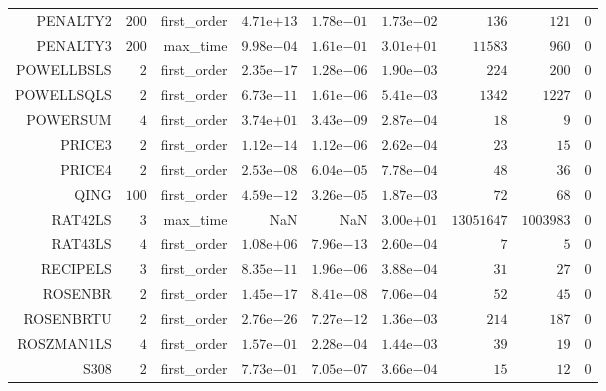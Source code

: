 \begin{longtable}{rrrrrrrrr}
PENALTY2 & \(   200\) & first\_order & \( 4.71\)e\(+13\) & \( 1.78\)e\(-01\) & \( 1.73\)e\(-02\) & \(   136\) & \(   121\) & \(     0\) \\
PENALTY3 & \(   200\) & max\_time & \( 9.98\)e\(-04\) & \( 1.61\)e\(-01\) & \( 3.01\)e\(+01\) & \( 11583\) & \(   960\) & \(     0\) \\
POWELLBSLS & \(     2\) & first\_order & \( 2.35\)e\(-17\) & \( 1.28\)e\(-06\) & \( 1.90\)e\(-03\) & \(   224\) & \(   200\) & \(     0\) \\
POWELLSQLS & \(     2\) & first\_order & \( 6.73\)e\(-11\) & \( 1.61\)e\(-06\) & \( 5.41\)e\(-03\) & \(  1342\) & \(  1227\) & \(     0\) \\
POWERSUM & \(     4\) & first\_order & \( 3.74\)e\(+01\) & \( 3.43\)e\(-09\) & \( 2.87\)e\(-04\) & \(    18\) & \(     9\) & \(     0\) \\
PRICE3 & \(     2\) & first\_order & \( 1.12\)e\(-14\) & \( 1.12\)e\(-06\) & \( 2.62\)e\(-04\) & \(    23\) & \(    15\) & \(     0\) \\
PRICE4 & \(     2\) & first\_order & \( 2.53\)e\(-08\) & \( 6.04\)e\(-05\) & \( 7.78\)e\(-04\) & \(    48\) & \(    36\) & \(     0\) \\
QING & \(   100\) & first\_order & \( 4.59\)e\(-12\) & \( 3.26\)e\(-05\) & \( 1.87\)e\(-03\) & \(    72\) & \(    68\) & \(     0\) \\
RAT42LS & \(     3\) & max\_time &       NaN &       NaN & \( 3.00\)e\(+01\) & \(13051647\) & \(1003983\) & \(     0\) \\
RAT43LS & \(     4\) & first\_order & \( 1.08\)e\(+06\) & \( 7.96\)e\(-13\) & \( 2.60\)e\(-04\) & \(     7\) & \(     5\) & \(     0\) \\
RECIPELS & \(     3\) & first\_order & \( 8.35\)e\(-11\) & \( 1.96\)e\(-06\) & \( 3.88\)e\(-04\) & \(    31\) & \(    27\) & \(     0\) \\
ROSENBR & \(     2\) & first\_order & \( 1.45\)e\(-17\) & \( 8.41\)e\(-08\) & \( 7.06\)e\(-04\) & \(    52\) & \(    45\) & \(     0\) \\
ROSENBRTU & \(     2\) & first\_order & \( 2.76\)e\(-26\) & \( 7.27\)e\(-12\) & \( 1.36\)e\(-03\) & \(   214\) & \(   187\) & \(     0\) \\
ROSZMAN1LS & \(     4\) & first\_order & \( 1.57\)e\(-01\) & \( 2.28\)e\(-04\) & \( 1.44\)e\(-03\) & \(    39\) & \(    19\) & \(     0\) \\
S308 & \(     2\) & first\_order & \( 7.73\)e\(-01\) & \( 7.05\)e\(-07\) & \( 3.66\)e\(-04\) & \(    15\) & \(    12\) & \(     0\) \\

\end{longtable}

